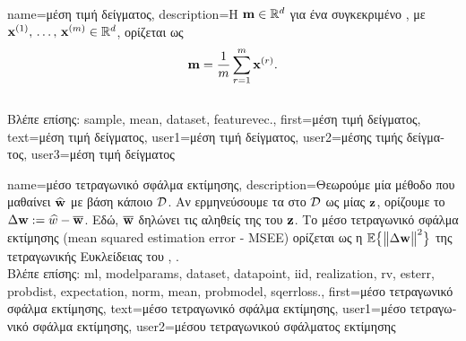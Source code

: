 {name={\foreignlanguage{greek}{μέση τιμή δείγματος}}, 
	description={\foreignlanguage{greek}{Η} 
		  ${\bf m} \in \mathbb{R}^{d}$ \foreignlanguage{greek}{για ένα συγκεκριμένο} 
		, \foreignlanguage{greek}{με} 
		 ${\bf x}^{(1)}, \,\ldots, \,{\bf x}^{(m)} \in \mathbb{R}^{d}$, 
		\foreignlanguage{greek}{ορίζεται ως}  
		$${\bf m} = \frac{1}{m} \sum_{r=1}^{m} {\bf x}^{(r)}.$$\\
		\foreignlanguage{greek}{Βλέπε επίσης:} \gls{sample}, \gls{mean}, \gls{dataset}, \gls{featurevec}.},
	first={\foreignlanguage{greek}{μέση τιμή δείγματος}},
	text={\foreignlanguage{greek}{μέση τιμή δείγματος}},
	user1={\foreignlanguage{greek}{μέση τιμή δείγματος}}, %
	user2={\foreignlanguage{greek}{μέσης τιμής δείγματος}}, %
	user3={\foreignlanguage{greek}{μέση τιμή δείγματος}} %
}

{name={\foreignlanguage{greek}{μέσο τετραγωνικό σφάλμα εκτίμησης}},
	description={\foreignlanguage{greek}{Θεωρούμε μία μέθοδο} 
		 \foreignlanguage{greek}{που μαθαίνει}  $\widehat{{\bf w}}$ 
		\foreignlanguage{greek}{με βάση κάποιο}  $\mathcal{D}$. 
		\foreignlanguage{greek}{Αν ερμηνεύσουμε τα}  \foreignlanguage{greek}{στο} $\mathcal{D}$ 
		\foreignlanguage{greek}{ως}   \foreignlanguage{greek}{μίας}  ${\bf z}$, 
		\foreignlanguage{greek}{ορίζουμε το}  $\Delta {\bf w} := \widehat{w} - \overline{{\bf w}}$. 
		\foreignlanguage{greek}{Εδώ, $\overline{{\bf w}}$ δηλώνει τις αληθείς}  \foreignlanguage{greek}{της} 
		 \foreignlanguage{greek}{του ${\bf z}$. Το μέσο τετραγωνικό σφάλμα εκτίμησης} 
		(mean squared estimation error - MSEE) \foreignlanguage{greek}{ορίζεται ως η}  
		$\mathbb{E} \big\{ \big\| \Delta {\bf w} \big\|^{2} \big\}$ \foreignlanguage{greek}{της τετραγωνικής Ευκλεί\-δειας}
		 \foreignlanguage{greek}{του}  \cite{LC}, \cite{kay}.\\
		\foreignlanguage{greek}{Βλέπε επίσης:} \gls{ml}, \gls{modelparams}, \gls{dataset}, \gls{datapoint}, \gls{iid}, \gls{realization}, \gls{rv}, 
		\gls{esterr}, \gls{probdist}, \gls{expectation}, \gls{norm},  \gls{mean}, \gls{probmodel}, \gls{sqerrloss}.},
	first={\foreignlanguage{greek}{μέσο τετραγωνικό σφάλμα εκτίμησης}},
	text={\foreignlanguage{greek}{μέσο τετραγωνικό σφάλμα εκτίμησης}},
	user1={\foreignlanguage{greek}{μέσο τετραγωνικό σφάλμα εκτίμησης}}, %
    	user2={\foreignlanguage{greek}{μέσου τετραγωνικού σφάλματος εκτίμησης}} %
}


